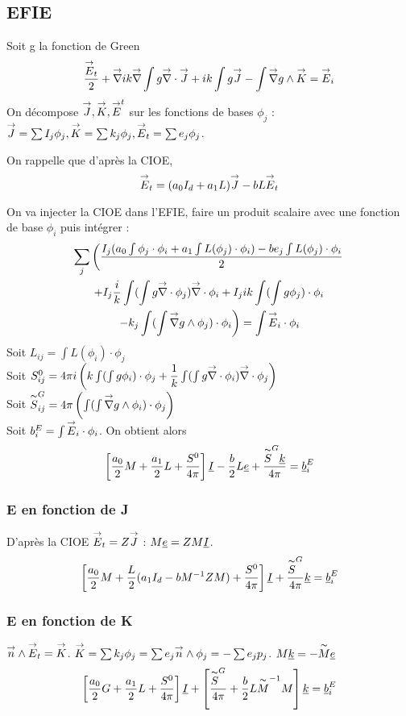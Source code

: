 \subsection{EFIE}
Soit g la fonction de Green
\[
  \frac{\vE_t}{2}+\vgrad{i}{k}\vgrad \int  g\vdiv\vJ +  ik\int g\vJ - \int \vgrad g \pvect \vK = \vE_i
  \]
On décompose $\vJ,\vK,\vE^t$ sur les fonctions de bases $\phi_j$ : $\vJ = \sum I_j \phi_j,\vK = \sum k_j \phi_j,\vE_t = \sum e_j \phi_j$. 

On rappelle que d’après la CIOE,
\[
  \vE_t = (a_0I_d+a_1L)\vJ -bL\vE_t
\]

On va injecter la CIOE dans l'EFIE, faire un produit scalaire avec une fonction de base $\phi_i$ puis intégrer : 
\begin{multline}
  \sum_j \left(\frac{I_j(a_0\int \phi_j \cdot \phi_i +a_1\int L(\phi_j) \cdot \phi_i) -be_j \int L(\phi_j)\cdot \phi_i}{2} \right. \\
  +I_j\frac{i}{k}\int (\int g\vdiv\phi_j)\vdiv \phi_i +  I_j ik\int (\int g\phi_j)\cdot \phi_i\\
  \left. -  k_j\int(\int \vgrad g \pvect \phi_j) \cdot \phi_i \right)= \int \vE_i \cdot \phi_i
\end{multline}
Soit $L_{ij} = \int L(\phi_i)\cdot\phi_j$\\
Soit $S^0_{ij}=4\pi i\left(k\int(\int g\phi_i)\cdot\phi_j + \frac{1}{k}\int(\int g\vdiv\phi_i)\vdiv\phi_j\right)$\\ 
Soit $\tilde S^G_{ij} = 4\pi\left(\int(\int \vgrad g \pvect \phi_i) \cdot \phi_j \right)$\\
Soit $b_i^E = \int \vE_i \cdot \phi_i$.
On obtient alors 
\[
  \left[\frac{a_0}{2}M + \frac{a_1}{2}L + \frac{S^0}{4\pi}\right]\v I - \frac{b}{2}L\v e+ \frac{\tilde  S^G \v k}{4\pi} = \v b_i^E
\]
\subsubsection{E en fonction de J}
D’après la CIOE $\vE_t = Z\vJ$ : $M\v e = Z M\v I$.
\[
  \left[\frac{a_0}{2}M + \frac{L}{2}(a_1I_d - bM^{-1}ZM) + \frac{S^0}{4\pi}\right]\v I + \frac{\tilde S^G }{4\pi}\v k = \v b_i^E
\]
\subsubsection{E en fonction de K}
$\vn \pvect \vE_t = \vK$.
$\vK = \sum k_j \phi_j = \sum e_j \vn \pvect \phi_j = -\sum e_j p_j $.
$M \v k = - \tilde M \v e$
\[
  \left[\frac{a_0}{2}G + \frac{a_1}{2}L+\frac{S^0}{4\pi}\right]\v I + \left[\frac{\tilde S^G }{4\pi}+  \frac{b}{2}L\tilde M^{-1}M \right]\v k = \v b_i^E
\]
